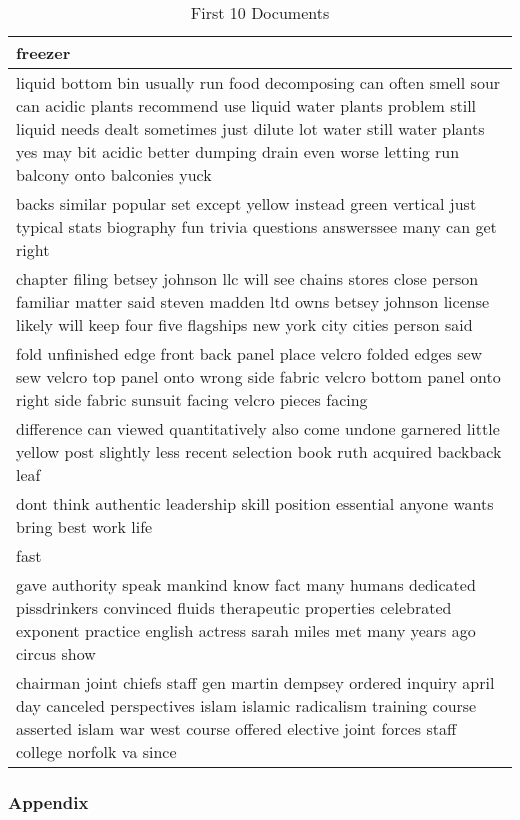 \documentclass[]{article}
\begin{document}
\begin{table}[t]

\caption{\label{tab:prepare-the-data-build-corpus}First 10 Documents}
\begin{tabular}{l}
\hline
freezer\\
\hline
liquid bottom bin usually run food decomposing can often smell sour can acidic plants recommend use liquid water plants problem still liquid needs dealt sometimes just dilute lot water still water plants yes may bit acidic better dumping drain even worse letting run balcony onto balconies yuck\\
\hline
backs similar popular set except yellow instead green vertical just typical stats biography fun trivia questions answerssee many can get right\\
\hline
chapter filing betsey johnson llc will see chains stores close person familiar matter said steven madden ltd owns betsey johnson license likely will keep four five flagships new york city cities person said\\
\hline
fold unfinished edge front back panel place velcro folded edges sew sew velcro top panel onto wrong side fabric velcro bottom panel onto right side fabric sunsuit facing velcro pieces facing\\
\hline
difference can viewed quantitatively also come undone garnered little yellow post slightly less recent selection book ruth acquired backback leaf\\
\hline
dont think authentic leadership skill position essential anyone wants bring best work life\\
\hline
fast\\
\hline
gave authority speak mankind know fact many humans dedicated pissdrinkers convinced fluids therapeutic properties celebrated exponent practice english actress sarah miles met many years ago circus show\\
\hline
chairman joint chiefs staff gen martin dempsey ordered inquiry april day canceled perspectives islam islamic radicalism training course asserted islam war west course offered elective joint forces staff college norfolk va since\\
\hline
\end{tabular}
\end{table}

\hypertarget{appendix}{%
\subsubsection{Appendix}\label{appendix}}
\end{document}
